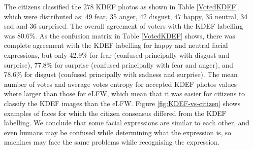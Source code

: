 

%
%
The citizens classified the 278 KDEF photos as shown in Table \ref{VotedKDEF}, which were distributed as: 49 fear, 35 anger, 42 disgust, 47 happy, 35 neutral, 34 sad and 36 surprised. The overall agreement of voters with the KDEF labelling was 80.6\%. As the confusion matrix in Table \ref{VotedKDEF} shows, there was complete agreement with the KDEF labelling for happy and neutral facial expressions, but only 42.9\% for fear (confused principally with disgust and surprise), 77.8\% for surprise (confused principally with fear  and anger), and 78.6\% for disgust (confused principally with sadness and surprise). 
The mean number of votes and average votes entropy for accepted KDEF photos values where larger than those for eLFW, which mean that it was easier for citizens to classify the KDEF images than the eLFW. 
Figure \ref{fig:KDEF-vs-citizen} shows examples of faces for which the citizen consensus differed from the KDEF labelling. We conclude that some facial expressions are similar to each other, and even humans may be confused while determining what the expression is, so machines may face the same problems while recognising the expression.


